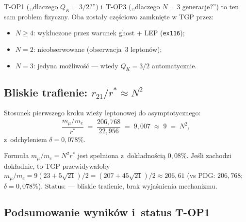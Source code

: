 \begin{corollary}
T-OP1 (,,dlaczego $Q_K = 3/2$?'') i~T-OP3 (,,dlaczego $N = 3$ genera\-cje?'')
to ten sam problem fizyczny.  Oba zosta\l{}y cz\k{e}\'sciowo
zamkni\k{e}te w TGP przez:
\begin{itemize}
  \item $N \geq 4$: wykluczone przez warunek ghost + LEP (\texttt{ex116});
  \item $N = 2$: nieobserwowane (obserwacja~$3$ leptonów);
  \item $N = 3$: jedyna mo\.zliwo\'s\'c --- wtedy $Q_K = 3/2$ automatycznie.
\end{itemize}
\end{corollary}

\subsection{Bliskie trafienie: $r_{21}/r^* \approx N^2$}
\label{app:T3-top4}

\begin{observation}[T-OP4]\label{obs:T3-top4}
Stosunek pierwszego kroku wie\.zy leptonowej do asymptotycznego:
\begin{equation}\label{eq:T3-top4}
  \frac{m_\mu/m_e}{r^*}
  \;=\; \frac{206{,}768}{22{,}956}
  \;=\; 9{,}007
  \;\approx\; 9 \;=\; N^2,
\end{equation}
z~odchyleniem $\delta = 0{,}078\%$.
\end{observation}

\begin{remark}
Formu\l{}a $m_\mu/m_e = N^2 r^*$ jest spe\l{}niona z~dok\l{}adno\'sci\k{a}
$0{,}08\%$.  Je\'sli zachodzi dok\l{}adnie, to TGP przewidywa\l{}oby
$m_\mu/m_e = 9(23 + 5\sqrt{21})/2 = (207 + 45\sqrt{21})/2 \approx 206{,}61$
(vs PDG: $206{,}768$; $\delta = 0{,}078\%$).
Status:  --- bliskie trafienie,
brak wyja\'snienia mechanizmu.
\end{remark}

\subsection{Podsumowanie wyników i~status T-OP1}
\label{app:T3-summary}

